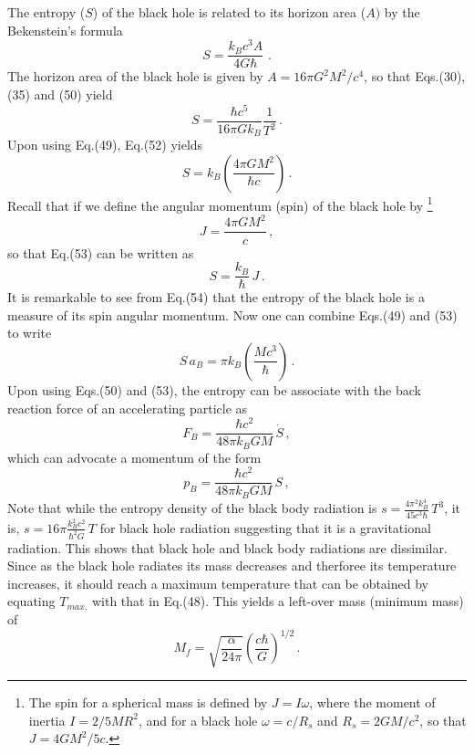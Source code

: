 \documentclass[12pt]{article}
\begin{document}
The entropy ($S$) of the black hole is related to its horizon area ($A)$ by the Bekenstein's  formula {\cite{entropy}}
\begin{equation}
S=\frac{k_Bc^3A}{4G\hbar}\,\,.
\end{equation}
The horizon area of the black hole is given by $A=16\pi G^2M^2/c^4$, so that Eqs.(30), (35) and (50) yield
\begin{equation}
S=\frac{\hbar c^5}{16 \pi G k_B}\frac{1}{T^2}\,.
\end{equation}
Upon using Eq.(49), Eq.(52) yields
\begin{equation}
 S=k_B\left(\frac{4\pi GM^2}{\hbar c}\right)\,.
\end{equation}
Recall that if we define the angular momentum (spin) of the black hole by \footnote{The spin for a spherical mass is defined by $J=I\omega$, where the moment of inertia $I=2/5 MR^2$,  and for a black hole $\omega=c/R_s$ and $R_s=2GM/c^2$, so that $J=4GM^2/5c$.}
$$J=\frac{4\pi GM^2}{c}\,,$$
so that Eq.(53) can be written as
\begin{equation}
 S=\frac{k_B}{\hbar}\, J\,.
\end{equation}
It is remarkable to see from Eq.(54) that the entropy of the black hole is a measure of its  spin angular momentum. Now one can combine Eqs.(49) and (53) to write
\begin{equation}
 S\,a_B=\pi k_B\left(\frac{Mc^3}{\hbar}\right)\,.
\end{equation}
Upon using Eqs.(50) and (53), the entropy can be associate with the back reaction force of an accelerating particle as
\begin{equation}
F_B=\frac{\hbar c^2}{48 \pi k_B GM}\, \dot S\,,
\end{equation}
which can advocate a momentum of the form
\begin{equation}
p_B=\frac{\hbar c^2}{48 \pi k_B GM}\,  S\,,
\end{equation}
Note that while the entropy density of the black body radiation is $s=\frac{4\pi^2k_B^4}{45c^3\hbar}\, T^3$, it is, $s=16 \pi \frac{k_B^2c^2}{\hbar^2G}\, T$ for black hole radiation suggesting that it is a gravitational radiation. This shows that black hole and black body radiations are dissimilar. Since as the black hole radiates its mass decreases and therforee its temperature increases, it should reach a maximum temperature that can be obtained by equating $T_{max.}$ with that in Eq.(48). This yields a left-over mass (minimum mass)  of
\begin{equation}
M_f=\sqrt{\frac{\alpha}{24\pi }}\left(\frac{c\hbar}{G}\right)^{1/2}\,.
\end{equation}
\end{document}

